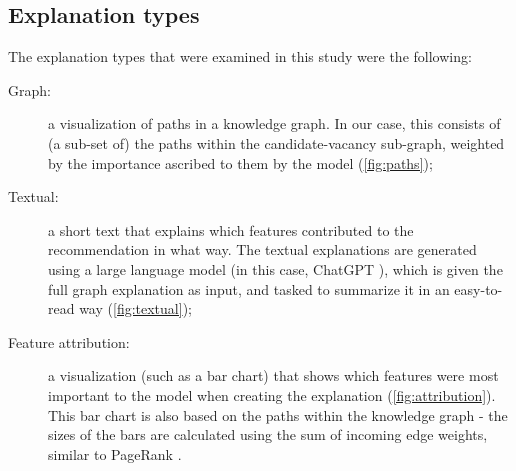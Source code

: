 \subsection{Explanation types}
\label{sec:explanation_types}
The explanation types that were examined in this study were the following:

\begin{description}
    \item[Graph:] a visualization of paths in a knowledge graph. In our case, this consists of (a sub-set of) the paths within the candidate-vacancy sub-graph, weighted by the importance ascribed to them by the model (\cref{fig:paths});
    \item[Textual:] a short text that explains which features contributed to the recommendation in what way. The textual explanations are generated using a large language model (in this case, ChatGPT \cite{openai2022chatgpt}), which is given the full graph explanation as input, and tasked to summarize it in an easy-to-read way (\cref{fig:textual}); 
    \item[Feature attribution:] a visualization (such as a bar chart) that shows which features were most important to the model when creating the explanation (\cref{fig:attribution}). This bar chart is also based on the paths within the knowledge graph - the sizes of the bars are calculated using the sum of incoming edge weights, similar to PageRank \cite{bianchini2005inside}.
\end{description}

